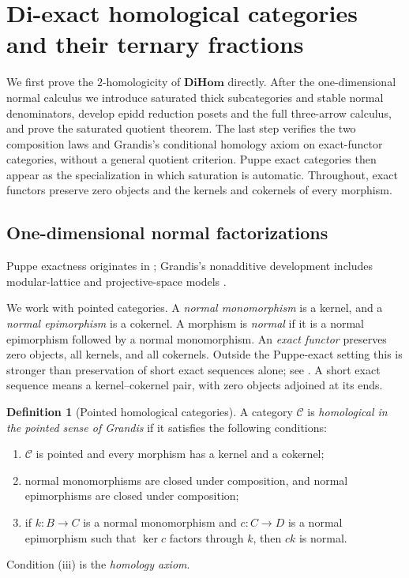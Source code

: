 \documentclass[11pt,reqno,a4paper]{amsart}
\theoremstyle{definition}
\newtheorem{definition}[theorem]{Definition}
\theoremstyle{remark}
\newcommand{\C}{\mathcal{C}}
\newcommand{\0}{\mathbf{0}}
\renewcommand{\1}{\mathbf{1}}
\newcommand{\DiHom}{\mathbf{DiHom}}
\begin{document}
\section{Di-exact homological categories and their ternary fractions}\label{sectionabelian}\label{sec:di-homological}

We first prove the $2$-homologicity of $\DiHom$ directly.
After the one-dimensional normal calculus we introduce saturated
thick subcategories and stable normal denominators, develop epidd
reduction posets and the full three-arrow calculus, and prove the
saturated quotient theorem. The last step verifies the two composition
laws and Grandis's conditional homology axiom on exact-functor
categories, without a general quotient criterion. Puppe exact
categories then appear as the specialization in which saturation is
automatic. Throughout, exact functors preserve zero objects and the
kernels and cokernels of every morphism.

\subsection{One-dimensional normal factorizations}

Puppe exactness originates in \cite{Pup62,Mit65,BP69}; Grandis's
nonadditive development includes modular-lattice and projective-space
models \cite{Gra84,CaG96,Gra12}. 

We work with pointed categories. A \emph{normal monomorphism} is a
kernel, and a \emph{normal epimorphism} is a cokernel. A morphism is
\emph{normal} if it is a normal epimorphism followed by a normal
monomorphism. An \emph{exact functor} preserves zero objects,
all kernels, and all cokernels. Outside the Puppe-exact setting this
is stronger than preservation of short exact sequences alone;
see \cite[Section 1.3]{Grandis92}. A short exact sequence means a
kernel--cokernel pair, with zero objects adjoined at its ends.

\begin{definition}[Pointed homological categories]\label{def:grandis-homological}
A category $\C$ is \emph{homological in the pointed sense of Grandis}
if it satisfies the following conditions:
\begin{enumerate}[label=\textup{(\roman*)}]
\item $\C$ is pointed and every morphism has a kernel and a cokernel;
\item normal monomorphisms are closed under composition, and normal
      epimorphisms are closed under composition;
\item if $k:B\to C$ is a normal monomorphism and $c:C\to D$
      is a normal epimorphism such that $\ker c$ factors through
      $k$, then $ck$ is normal.
\end{enumerate}
Condition \textup{(iii)} is the \emph{homology axiom}.
\end{definition}
\end{document}
